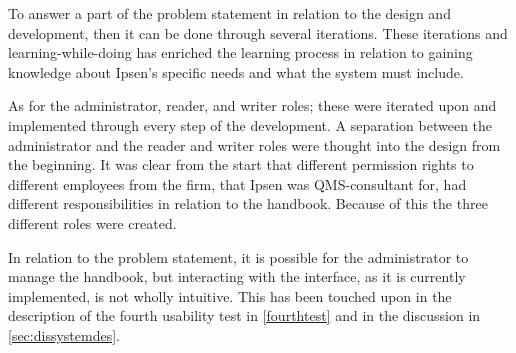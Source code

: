 To answer a part of the problem statement in relation to the design and development, then it can be done through several iterations.
These iterations and learning-while-doing has enriched the learning process in relation to gaining knowledge about Ipsen's specific needs and what the system must include.


As for the administrator, reader, and writer roles; these were iterated upon and implemented through every step of the development.
A separation between the administrator and the reader and writer roles were thought into the design from the beginning.
It was clear from the start that different permission rights to different employees from the firm, that Ipsen was QMS-consultant for, had different responsibilities in relation to the handbook.
Because of this the three different roles were created.

In relation to the problem statement, it is possible for the administrator to manage the handbook, but interacting with the interface, as it is currently implemented, is not wholly intuitive.
This has been touched upon in the description of the fourth usability test in \cref{fourthtest} and in the discussion in \cref{sec:dissystemdes}.

%
